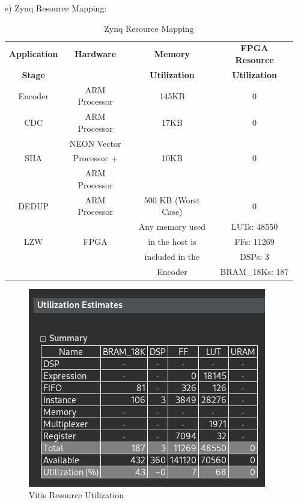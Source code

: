 \documentclass[../main.tex]{subfiles}
\begin{document}
\begin{enumerate}
\begin{enumerate}
    \end{enumerate}

    \item[e)] Zynq Resource Mapping:
    
    \begin{table}[H]
        \centering
        \begin{tabular}{|c|c|c|c|} \hline 
             \textbf{Application}&  \textbf{Hardware}&  \textbf{Memory}& \textbf{FPGA Resource}\\
             \textbf{Stage}&  & \textbf{Utilization} & \textbf{Utilization}\\ \hline
             Encoder&  ARM Processor&  145KB& 0\\ \hline 
             CDC&  ARM Processor&  17KB& 0\\ \hline
             &  NEON Vector&  & \\
             SHA&  Processor +&  10KB& 0\\
             & ARM Processor&  & \\ \hline 
             DEDUP&  ARM Processor&  500 KB (Worst Case)& 0\\ \hline 
             &  &  Any memory used &LUTs: 48550 \\
             LZW&  FPGA&  in the host is  &FFs: 11269 \\
             &  &  included in the &DSPs: 3 \\
             &  &  Encoder &BRAM\_18Ks: 187 \\ \hline
        \end{tabular}
        \caption{Zynq Resource Mapping}
        \label{tab:zynq_mapping}
    \end{table}

    \begin{figure}[H]
        \centering
        \includegraphics[width=0.5\linewidth]{Images/image15.png}
        \caption{Vitis Resource Utilization}
        \label{fig:vitis_util}
    \end{figure}


\end{enumerate}
\end{document}
